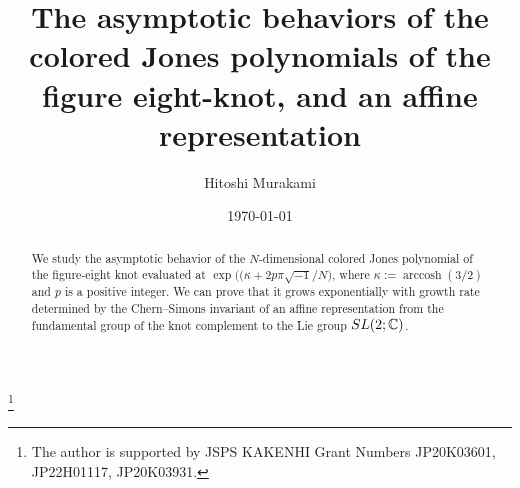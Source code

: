 \documentclass[a4paper,dvipdfmx]{amsart}
\theoremstyle{plain}
\theoremstyle{definition}
\theoremstyle{remark}
\newcommand{\C}{\mathbb{C}}
\newcommand{\SL}{\rm{SL}}
\newcommand{\arccosh}{\operatorname{arccosh}}
\renewcommand{\i}{\sqrt{-1}}
\numberwithin{equation}{section}
\begin{document}
\title[The asymptotic behaviors of the colored Jones polynomials]
{The asymptotic behaviors of the colored Jones polynomials of the figure eight-knot, and an affine representation}
\author{Hitoshi Murakami}
\address{
Graduate School of Information Sciences,
Tohoku University,
Aramaki-aza-Aoba 6-3-09, Aoba-ku,
Sendai 980-8579, Japan}
\date{\today}
\begin{abstract}
We study the asymptotic behavior of the $N$-dimensional colored Jones polynomial of the figure-eight knot evaluated at $\exp\bigl((\kappa+2p\pi\i/N\bigr)$, where $\kappa:=\arccosh(3/2)$ and $p$ is a positive integer.
We can prove that it grows exponentially with growth rate determined by the Chern--Simons invariant of an affine representation from the fundamental group of the knot complement to the Lie group $\SL(2;\C)$.
\end{abstract}
\thanks{The author is supported by JSPS KAKENHI Grant Numbers JP20K03601, JP22H01117, JP20K03931.}
\maketitle
\end{document}
